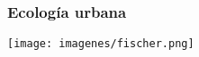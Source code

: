\documentclass[compress]{beamer}
\begin{document}


{
\begin{frame}
\frametitle{Ecología urbana}
\vspace{-0.5cm}

\begin{center}
\hspace*{-1cm}\texttt{[image: imagenes/fischer.png]}\\

\end{center}

\end{frame}
}
\end{document}
